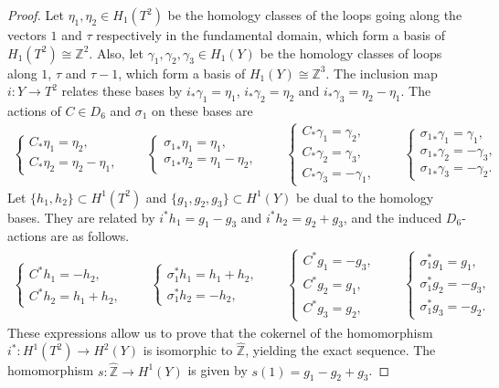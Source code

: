 \documentclass[11pt]{article}
\theoremstyle{definition}
\newcommand{\Z}{\mathbb{Z}}
\begin{document}
\begin{proof}
Let $\eta_1, \eta_2 \in H_1(T^2)$ be the homology classes of the loops going along the vectors $1$ and $\tau$ respectively in the fundamental domain, which form a basis of $H_1(T^2) \cong \Z^2$. Also, let $\gamma_1, \gamma_2, \gamma_3 \in H_1(Y)$ be the homology classes of loops along $1$, $\tau$ and $\tau - 1$, which form a basis of $H_1(Y) \cong \Z^3$. The inclusion map $i\colon Y \to T^2$ relates these bases by $i_*\gamma_1 = \eta_1$, $i_*\gamma_2 = \eta_2$ and $i_*\gamma_3 = \eta_2 - \eta_1$. The actions of $C \in D_6$ and $\sigma_1$ on these bases are
\begin{gather*}
\begin{cases}
C_*\eta_1 = \eta_2, \\
C_*\eta_2 = \eta_2 - \eta_1,
\end{cases}
\qquad
\begin{cases}
{\sigma_1}_*\eta_1 = \eta_1, \\
{\sigma_1}_*\eta_2 = \eta_1 - \eta_2,
\end{cases}
\qquad
\begin{cases}
C_*\gamma_1 = \gamma_2, \\
C_*\gamma_2 = \gamma_3, \\
C_*\gamma_3 = - \gamma_1,
\end{cases}
\qquad
\begin{cases}
{\sigma_1}_*\gamma_1 = \gamma_1, \\
{\sigma_1}_*\gamma_2 = - \gamma_3, \\
{\sigma_1}_*\gamma_3 = - \gamma_2.
\end{cases}\!\!\!
\end{gather*}
Let $\{ h_1, h_2 \} \subset H^1(T^2)$ and $\{ g_1, g_2, g_3 \} \subset H^1(Y)$ be dual to the homology bases. They are related by $i^*h_1 = g_1 - g_3$ and $i^*h_2 = g_2 + g_3$, and the induced $D_6$-actions are as follows.
\begin{gather*}
\begin{cases}
C^*h_1 = - h_2, \\
C^*h_2 = h_1 + h_2,
\end{cases}\qquad
\begin{cases}
\sigma_1^*h_1 = h_1 + h_2, \\
\sigma_1^*h_2 = - h_2,
\end{cases}\qquad
\begin{cases}
C^*g_1 = - g_3, \\
C^*g_2 = g_1, \\
C^*g_3 = g_2,
\end{cases}\qquad
\begin{cases}
\sigma_1^*g_1 = g_1, \\
\sigma_1^*g_2 = - g_3, \\
\sigma_1^*g_3 = - g_2.
\end{cases}
\end{gather*}
These expressions allow us to prove that the cokernel of the homomorphism $i^* \colon H^1(T^2) \to H^2(Y)$ is isomorphic to $\hat{\Z}$, yielding the exact sequence. The homomorphism $s\colon \hat{\Z} \to H^1(Y)$ is given by $s(1) = g_1 - g_2 + g_3$.
\end{proof}
\end{document}
